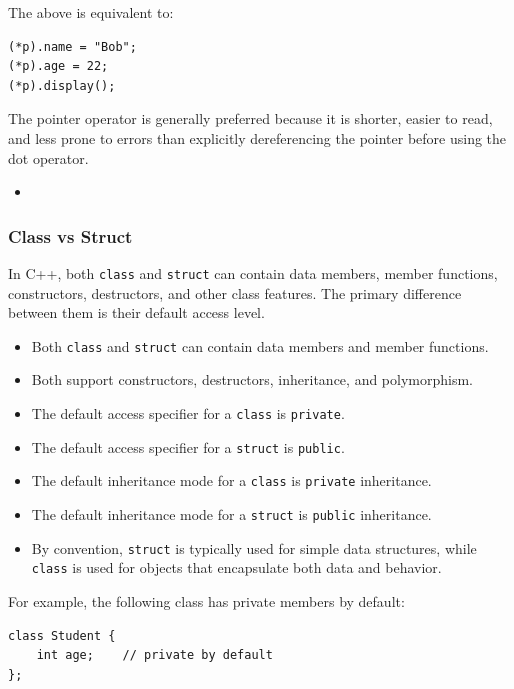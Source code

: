 \documentclass[10pt]{article}
\begin{document}
The above is equivalent to:

\begin{verbatim}
(*p).name = "Bob";
(*p).age = 22;
(*p).display();
\end{verbatim}

The pointer operator is generally preferred because it is shorter, easier to read, and less prone to errors than explicitly dereferencing the pointer before using the dot operator.

\newpage

\begin{itemize}
	\item {}
\end{itemize}

\newpage
\subsubsection{Class vs Struct}

In C++, both \verb|class| and \verb|struct| can contain data members, member functions, constructors, destructors, and other class features. The primary difference between them is their default access level.

\begin{itemize}
    \item Both \verb|class| and \verb|struct| can contain data members and member functions.
    \item Both support constructors, destructors, inheritance, and polymorphism.
    \item The default access specifier for a \verb|class| is \verb|private|.
    \item The default access specifier for a \verb|struct| is \verb|public|.
    \item The default inheritance mode for a \verb|class| is \verb|private| inheritance.
    \item The default inheritance mode for a \verb|struct| is \verb|public| inheritance.
    \item By convention, \verb|struct| is typically used for simple data structures, while \verb|class| is used for objects that encapsulate both data and behavior.
\end{itemize}

For example, the following class has private members by default:

\begin{verbatim}
class Student {
    int age;    // private by default
};
\end{verbatim}
\end{document}

